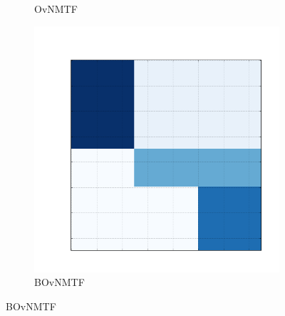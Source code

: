 \documentclass[10pt]{beamer}
\begin{document}
\begin{frame}
\begin{figure}[H]
\begin{subfigure}[b]{0.13\textwidth}
          \caption*{OvNMTF}
      \end{subfigure}
      \begin{subfigure}[b]{0.13\textwidth}
          \includegraphics[width=\textwidth]{img/e-reconstruction-binovnmtf.png}
          \caption*{BOvNMTF}
      \end{subfigure}
  \end{figure}

\end{frame}


\end{document}

